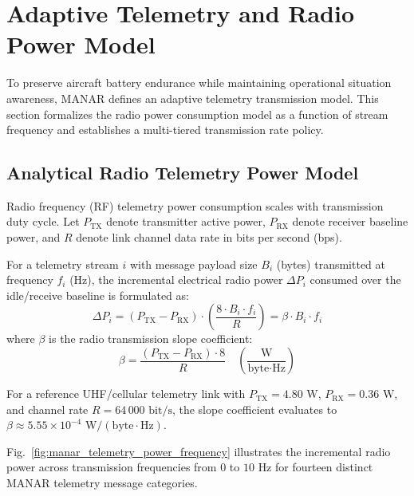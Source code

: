 \section{Adaptive Telemetry and Radio Power Model}

To preserve aircraft battery endurance while maintaining operational situation awareness, MANAR defines an adaptive telemetry transmission model. This section formalizes the radio power consumption model as a function of stream frequency and establishes a multi-tiered transmission rate policy.

\subsection{Analytical Radio Telemetry Power Model}
Radio frequency (RF) telemetry power consumption scales with transmission duty cycle. Let $P_{\mathrm{TX}}$ denote transmitter active power, $P_{\mathrm{RX}}$ denote receiver baseline power, and $R$ denote link channel data rate in bits per second (bps). 

For a telemetry stream $i$ with message payload size $B_i$ (bytes) transmitted at frequency $f_i$ (Hz), the incremental electrical radio power $\Delta P_i$ consumed over the idle/receive baseline is formulated as:
\begin{equation}
\Delta P_i = (P_{\mathrm{TX}} - P_{\mathrm{RX}}) \cdot \left(\frac{8 \cdot B_i \cdot f_i}{R}\right) = \beta \cdot B_i \cdot f_i
\end{equation}
where $\beta$ is the radio transmission slope coefficient:
\begin{equation}
\beta = \frac{(P_{\mathrm{TX}} - P_{\mathrm{RX}}) \cdot 8}{R} \quad \left(\frac{\text{W}}{\text{byte} \cdot \text{Hz}}\right)
\end{equation}

For a reference UHF/cellular telemetry link with $P_{\mathrm{TX}} = 4.80\text{ W}$, $P_{\mathrm{RX}} = 0.36\text{ W}$, and channel rate $R = 64\,000\text{ bit/s}$, the slope coefficient evaluates to $\beta \approx 5.55 \times 10^{-4}\text{ W}/(\text{byte}\cdot\text{Hz})$.

Fig.~\ref{fig:manar_telemetry_power_frequency} illustrates the incremental radio power across transmission frequencies from $0$ to $10\text{ Hz}$ for fourteen distinct MANAR telemetry message categories.

